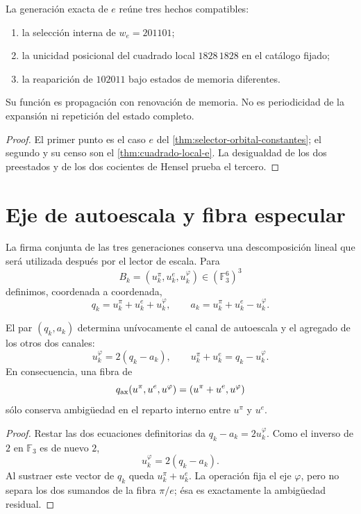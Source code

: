 \begin{proposition}
\label{prop:propagacion-e-rev6}
La generación exacta de \(e\) reúne tres hechos compatibles:
\begin{enumerate}
\item la selección interna de \(w_e=201101\);
\item la unicidad posicional del cuadrado local \(1828\,1828\) en el
catálogo fijado;
\item la reaparición de \(102011\) bajo estados de memoria diferentes.
\end{enumerate}
Su función es propagación con renovación de memoria. No es periodicidad de
la expansión ni repetición del estado completo.
\end{proposition}

\begin{proof}
El primer punto es el caso \(e\) del
\cref{thm:selector-orbital-constantes}; el segundo y su censo son el
\cref{thm:cuadrado-local-e}. La desigualdad de los dos preestados y de los
dos cocientes de Hensel prueba el tercero.
\end{proof}

\section{Eje de autoescala y fibra especular}

La firma conjunta de las tres generaciones conserva una descomposición lineal
que será utilizada después por el lector de escala. Para
\[
 B_k=(u_k^\pi,u_k^e,u_k^\varphi)
 \in(\mathbb F_3^6)^3
\]
definimos, coordenada a coordenada,
\[
 q_k=u_k^\pi+u_k^e+u_k^\varphi,
 \qquad
 a_k=u_k^\pi+u_k^e-u_k^\varphi.
\]

\begin{theorem}
\label{thm:eje-espejo-nonadico}
El par \((q_k,a_k)\) determina unívocamente el canal de autoescala y el
agregado de los otros dos canales:
\[
 u_k^\varphi=2(q_k-a_k),
 \qquad
 u_k^\pi+u_k^e=q_k-u_k^\varphi.
\]
En consecuencia, una fibra de
\[
 q_{\rm ax}(u^\pi,u^e,u^\varphi)
 =(u^\pi+u^e,u^\varphi)
\]
sólo conserva ambigüedad en el reparto interno entre \(u^\pi\) y \(u^e\).
\end{theorem}

\begin{proof}
Restar las dos ecuaciones definitorias da
\(q_k-a_k=2u_k^\varphi\). Como el inverso de \(2\) en \(\mathbb F_3\) es
de nuevo \(2\),
\[
u_k^\varphi=2(q_k-a_k).
\]
Al sustraer este vector de \(q_k\) queda
\(u_k^\pi+u_k^e\). La operación fija el eje \(\varphi\), pero no separa
los dos sumandos de la fibra \(\pi/e\); ésa es exactamente la ambigüedad
residual.
\end{proof}

